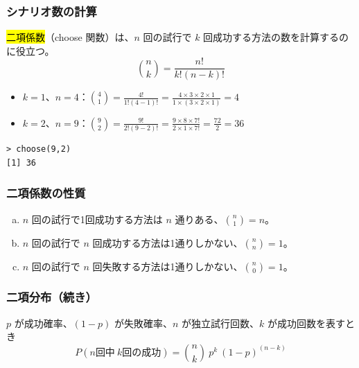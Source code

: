 \begin{frame}[fragile]
\frametitle{シナリオ数の計算}

{
\hl{二項係数}（choose 関数）は、$n$ 回の試行で $k$ 回成功する方法の数を計算するのに役立つ。
\[ {n \choose k} = \frac{n!}{k! (n - k)!} \]
}

\begin{itemize}

\item $k = 1$、$n = 4$：${4 \choose 1} = \frac{4!}{1! (4 - 1)!} = \frac{4 \times 3 \times 2 \times 1}{1 \times (3 \times 2 \times 1)} = 4$

\item $k = 2$、$n = 9$：${9 \choose 2} = \frac{9!}{2! (9 - 2)!} = \frac{9 \times 8 \times 7!}{2 \times 1 \times 7!} = \frac{72}{2} = 36$

\end{itemize}

\vfill

\begin{beamerboxesrounded}[shadow = true, lower = code body]{}
{\small
\begin{verbatim}
> choose(9,2)
[1] 36
\end{verbatim}
}
\end{beamerboxesrounded}

\end{frame}


\begin{frame}[fragile]
\frametitle{二項係数の性質}


\begin{enumerate}[(a)]
\item $n$ 回の試行で1回成功する方法は $n$ 通りある、${n \choose 1} = n$。
\item $n$ 回の試行で $n$ 回成功する方法は1通りしかない、${n \choose n} = 1$。
\item $n$ 回の試行で $n$ 回失敗する方法は1通りしかない、${n \choose 0} = 1$。
\end{enumerate}

\end{frame}


\begin{frame}
\frametitle{二項分布（続き）}

{
$p$ が成功確率、$(1-p)$ が失敗確率、$n$ が独立試行回数、$k$ が成功回数を表すとき
\[P(n\text{回中}~k\text{回の成功}) = {n \choose k}~p^k~(1-p)^{(n-k)} \]
}


\end{frame}

